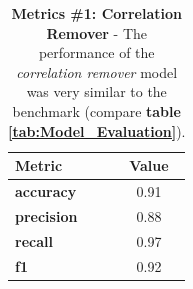 \begin{table}[!htbp]
    \centering
    \begin{tabular}{l c}
    \toprule
    \textbf{Metric} & \textbf{Value} \\
    \midrule
    \textbf{accuracy} & 0.91 \\
    \textbf{precision} & 0.88 \\
    \textbf{recall} & 0.97 \\
    \textbf{f1} & 0.92 \\
    \bottomrule
    \end{tabular}
    \medskip
    \caption[Metrics \#1: Correlation Remover]{\textbf{Metrics \#1: Correlation Remover} - The performance of the \textit{correlation remover} model was very similar to the benchmark (compare \textbf{table \ref{tab:Model_Evaluation}}).}
    \label{tab:Model_Evaluation_Corr_Rem}
\end{table}

